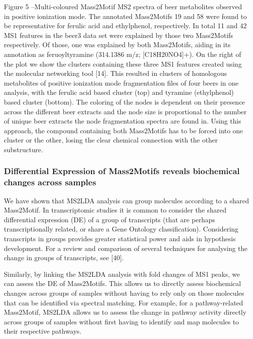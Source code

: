Figure 5 –Multi-coloured Mass2Motif MS2 spectra of beer metabolites observed in positive ionization mode. The annotated Mass2Motifs 19 and 58 were found to be representative for ferulic acid and ethylphenol, respectively. In total 11 and 42 MS1 features in the beer3 data set were explained by those two Mass2Motifs respectively. Of those, one was explained by both Mass2Motifs, aiding in its annotation as feruoyltyramine (314.1386 m/z; [C18H20NO4]+). On the right of the plot we show the clusters containing these three MS1 features created using the molecular networking tool [14]. This resulted in clusters of homologous metabolites of positive ionization mode fragmentation files of four beers in one analysis, with the ferulic acid based cluster (top) and tyramine (ethylphenol) based cluster (bottom). The coloring of the nodes is dependent on their presence across the different beer extracts and the node size is proportional to the number of unique beer extracts the node fragmentation spectra are found in. Using this approach, the compound containing both Mass2Motifs has to be forced into one cluster or the other, losing the clear chemical connection with the other substructure.

\subsubsection{Differential Expression of Mass2Motifs reveals biochemical changes across samples}

We have shown that MS2LDA analysis can group molecules according to a shared Mass2Motif. In transcriptomic studies it is common to consider the shared differential expression (DE) of a group of transcripts (that are perhaps transcriptionally related, or share a Gene Ontology classification). Considering transcripts in groups provides greater statistical power and aids in hypothesis development. For a review and comparison of several techniques for analysing the change in groups of transcripts, see [40].

Similarly, by linking the MS2LDA analysis with fold changes of MS1 peaks, we can assess the DE of Mass2Motifs. This allows us to directly assess biochemical changes across groups of samples without having to rely only on those molecules that can be identified via spectral matching. For example, for a pathway-related Mass2Motif, MS2LDA allows us to assess the change in pathway activity directly across groups of samples without first having to identify and map molecules to their respective pathways.

